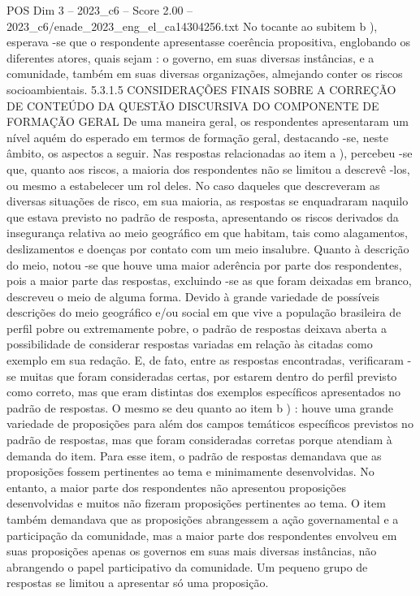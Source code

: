 \begin{textsample}{POS Dim 3 – 2023\_c6 – Score 2.00 – 2023\_c6/enade\_2023\_eng\_el\_ca14304256.txt}
No tocante ao subitem b ), esperava -se que o respondente apresentasse coerência propositiva, englobando os diferentes atores, quais sejam : o governo, em suas diversas instâncias, e a comunidade, também em suas diversas organizações, almejando conter os riscos socioambientais. 5.3.1.5 CONSIDERAÇÕES FINAIS SOBRE A CORREÇÃO DE CONTEÚDO DA QUESTÃO DISCURSIVA DO COMPONENTE DE FORMAÇÃO GERAL De uma maneira geral, os respondentes apresentaram um nível aquém do esperado em termos de formação geral, destacando -se, neste âmbito, os aspectos a seguir.
Nas respostas relacionadas ao item a ), percebeu -se que, quanto aos riscos, a maioria dos respondentes não se limitou a descrevê -los, ou mesmo a estabelecer um rol deles.
No caso daqueles que descreveram as diversas situações de risco, em sua maioria, as respostas se enquadraram naquilo que estava previsto no padrão de resposta, apresentando os riscos derivados da insegurança relativa ao meio geográfico em que habitam, tais como alagamentos, deslizamentos e doenças por contato com um meio insalubre.
Quanto à descrição do meio, notou -se que houve uma maior aderência por parte dos respondentes, pois a maior parte das respostas, excluindo -se as que foram deixadas em branco, descreveu o meio de alguma forma.
Devido à grande variedade de possíveis descrições do meio geográfico e/ou social em que vive a população brasileira de perfil pobre ou extremamente pobre, o padrão de respostas deixava aberta a possibilidade de considerar respostas variadas em relação às citadas como exemplo em sua redação.
E, de fato, entre as respostas encontradas, verificaram -se muitas que foram consideradas certas, por estarem dentro do perfil previsto como correto, mas que eram distintas dos exemplos específicos apresentados no padrão de respostas.
O mesmo se deu quanto ao item b ) : houve uma grande variedade de proposições para além dos campos temáticos específicos previstos no padrão de respostas, mas que foram consideradas corretas porque atendiam à demanda do item.
Para esse item, o padrão de respostas demandava que as proposições fossem pertinentes ao tema e minimamente desenvolvidas.
No entanto, a maior parte dos respondentes não apresentou proposições desenvolvidas e muitos não fizeram proposições pertinentes ao tema.
O item também demandava que as proposições abrangessem a ação governamental e a participação da comunidade, mas a maior parte dos respondentes envolveu em suas proposições apenas os governos em suas mais diversas instâncias, não abrangendo o papel participativo da comunidade.
Um pequeno grupo de respostas se limitou a apresentar só uma proposição.

\end{textsample}
